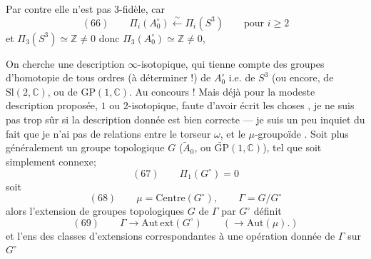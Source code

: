 Par contre elle n'est pas $3$-fidèle, car
\[
(66)\qquad \Pi_i(A_0^\circ)\xleftarrow{\sim}\Pi_i(S^3)
\qquad\text{pour }i\geq2
\]
et $\Pi_3(S^3)\simeq\mathbb Z\ne0$ donc $\Pi_3(A_0^\circ)\simeq\mathbb Z\ne0$,

On cherche une description $\infty$-isotopique,
qui tienne compte des groupes d'homotopie
de tous ordres (à déterminer !) de
$A_0^\circ$ i.e. de $S^3$ (ou encore, de $\mathrm{Sl}(2,\mathbb C)$,
ou de $\mathrm{GP}(1,\mathbb C)$. Au concours !
Mais déjà pour la modeste description proposée,
 $1$ ou $2$-isotopique, faute d'avoir écrit les
choses , je ne suis pas trop sûr si
la description donnée est bien correcte --- je
suis un peu inquiet du fait que je n'ai
pas  de  relations entre le \inserted{$\mu$-}torseur $\omega$,
et le $\mu$-groupoïde . Soit plus généralement
un groupe topologique $G$ ($\widetilde A_0$, ou $\widetilde{\mathrm{GP}}(1,\mathbb C)$),
tel que  soit simplement connexe; 
\[
(67)\qquad\Pi_1(G^\circ)=0
\]
soit
\[
(68)\qquad \mu=\mathrm{Centre}(G^\circ),\qquad\Gamma=G/G^\circ
\]
alors l'extension de groupes topologiques $G$
de $\Gamma$ par $G^\circ$ définit
\[
(69)\qquad\Gamma\longrightarrow\mathrm{Aut\,ext}(G^\circ)
\qquad(\longrightarrow\mathrm{Aut}(\mu).)
\]
et l'ens des classes d'extensions correspondantes
à une opération  donnée de $\Gamma$ sur $G^\circ$
